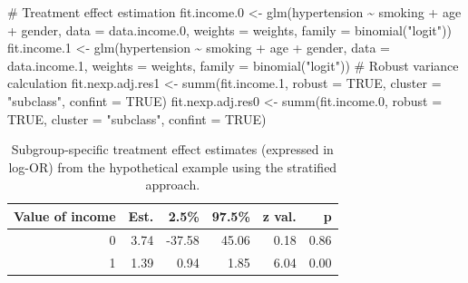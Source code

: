 \documentclass[
  letterpaper,
  DIV=11,
  numbers=noendperiod]{scrreprt}
\newenvironment{Shaded}{\begin{snugshade}}{\end{snugshade}}
\newcommand{\AttributeTok}[1]{\textcolor[rgb]{0.40,0.45,0.13}{#1}}
\newcommand{\CommentTok}[1]{\textcolor[rgb]{0.37,0.37,0.37}{#1}}
\newcommand{\ConstantTok}[1]{\textcolor[rgb]{0.56,0.35,0.01}{#1}}
\newcommand{\FloatTok}[1]{\textcolor[rgb]{0.68,0.00,0.00}{#1}}
\newcommand{\FunctionTok}[1]{\textcolor[rgb]{0.28,0.35,0.67}{#1}}
\newcommand{\NormalTok}[1]{\textcolor[rgb]{0.00,0.23,0.31}{#1}}
\newcommand{\OtherTok}[1]{\textcolor[rgb]{0.00,0.23,0.31}{#1}}
\newcommand{\SpecialCharTok}[1]{\textcolor[rgb]{0.37,0.37,0.37}{#1}}
\newcommand{\StringTok}[1]{\textcolor[rgb]{0.13,0.47,0.30}{#1}}
\begin{document}
\begin{Shaded}
\begin{Highlighting}[]
\CommentTok{\# Treatment effect estimation}
\NormalTok{fit.income}\FloatTok{.0} \OtherTok{\textless{}{-}} \FunctionTok{glm}\NormalTok{(hypertension }\SpecialCharTok{\textasciitilde{}}\NormalTok{ smoking }\SpecialCharTok{+}\NormalTok{ age }\SpecialCharTok{+}\NormalTok{ gender, }
                   \AttributeTok{data =}\NormalTok{ data.income}\FloatTok{.0}\NormalTok{, }\AttributeTok{weights =}\NormalTok{ weights,}
                   \AttributeTok{family =} \FunctionTok{binomial}\NormalTok{(}\StringTok{"logit"}\NormalTok{))}
\NormalTok{fit.income}\FloatTok{.1} \OtherTok{\textless{}{-}} \FunctionTok{glm}\NormalTok{(hypertension }\SpecialCharTok{\textasciitilde{}}\NormalTok{ smoking }\SpecialCharTok{+}\NormalTok{ age }\SpecialCharTok{+}\NormalTok{ gender, }
                   \AttributeTok{data =}\NormalTok{ data.income}\FloatTok{.1}\NormalTok{, }\AttributeTok{weights =}\NormalTok{ weights,}
                   \AttributeTok{family =} \FunctionTok{binomial}\NormalTok{(}\StringTok{"logit"}\NormalTok{))}
\CommentTok{\# Robust variance calculation}
\NormalTok{fit.nexp.adj.res1 }\OtherTok{\textless{}{-}} \FunctionTok{summ}\NormalTok{(fit.income}\FloatTok{.1}\NormalTok{,  }
                          \AttributeTok{robust =} \ConstantTok{TRUE}\NormalTok{,}
                          \AttributeTok{cluster =} \StringTok{"subclass"}\NormalTok{,}
                          \AttributeTok{confint =} \ConstantTok{TRUE}\NormalTok{)}
\NormalTok{fit.nexp.adj.res0 }\OtherTok{\textless{}{-}} \FunctionTok{summ}\NormalTok{(fit.income}\FloatTok{.0}\NormalTok{, }
                          \AttributeTok{robust =} \ConstantTok{TRUE}\NormalTok{,}
                          \AttributeTok{cluster =} \StringTok{"subclass"}\NormalTok{,}
                          \AttributeTok{confint =} \ConstantTok{TRUE}\NormalTok{)}
\end{Highlighting}
\end{Shaded}

\hypertarget{tbl-stratified-approach}{}
\begin{table}[!h]
\caption{\label{tbl-stratified-approach}Subgroup-specific treatment effect estimates (expressed in log-OR) from
the hypothetical example using the stratified approach. }\tabularnewline

\centering
\begin{tabular}{rrrrrr}
\toprule
Value of income & Est. & 2.5\% & 97.5\% & z val. & p\\
\midrule
0 & 3.74 & -37.58 & 45.06 & 0.18 & 0.86\\
1 & 1.39 & 0.94 & 1.85 & 6.04 & 0.00\\
\bottomrule
\end{tabular}
\end{table}
\end{document}
